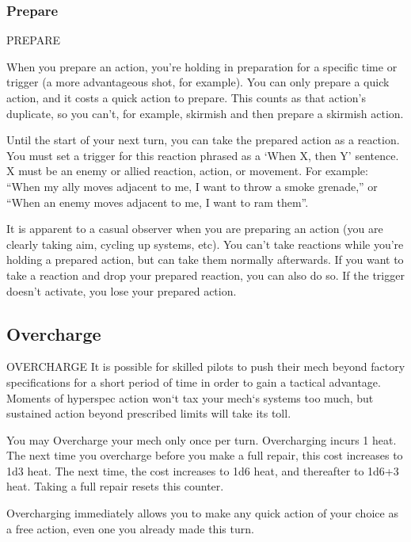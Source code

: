 \subsubsection{Prepare}
                                                PREPARE

When you prepare an action, you’re holding in preparation for a specific time or trigger (a more
advantageous shot, for example). You can only prepare a quick action, and it costs a quick
action to prepare. This counts as that action’s duplicate, so you can’t, for example, skirmish and
then prepare a skirmish action.


Until the start of your next turn, you can take the prepared action as a reaction. You must set a
trigger for this reaction phrased as a ‘When X, then Y’ sentence. X must be an enemy or allied
reaction, action, or movement. For example: “When my ally moves adjacent to me, I want to
throw a smoke grenade,” or “When an enemy moves adjacent to me, I want to ram them”.


It is apparent to a casual observer when you are preparing an action (you are clearly taking aim,
cycling up systems, etc). You can’t take reactions while you’re holding a prepared action, but can
take them normally afterwards. If you want to take a reaction and drop your prepared reaction,
you can also do so. If the trigger doesn’t activate, you lose your prepared action.

\subsection{Overcharge}
                                            OVERCHARGE
It is possible for skilled pilots to push their mech beyond factory specifications for a short period
of time in order to gain a tactical advantage. Moments of hyperspec action won‘t tax your
mech‘s systems too much, but sustained action beyond prescribed limits will take its toll.





You may Overcharge your mech only once per turn. Overcharging incurs 1 heat. The next time
you overcharge before you make a full repair, this cost increases to 1d3 heat. The next time, the
cost increases to 1d6 heat, and thereafter to 1d6+3 heat. Taking a full repair resets this counter.


Overcharging immediately allows you to make any quick action of your choice as a free
action, even one you already made this turn.

